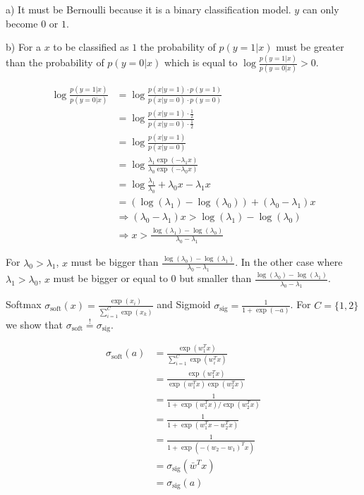%
%
%
\begin{flushleft}
a) It must be Bernoulli because it is a binary classification model. $y$ can only become $0$ or $1$.
\end{flushleft}
\begin{flushleft}
b) For a $x$ to be classified as $1$ the probability of $p(y=1|x)$ must be greater than the probability of $p(y=0|x)$ which is equal to $\log \frac{p(y=1|x)}{p(y=0|x)} > 0$.
\end{flushleft}
\begin{align*}
  \log \frac{p(y=1|x)}{p(y=0|x)} &= \log \frac{p(x|y=1)\cdot p(y=1)}{p(x|y=0)\cdot p(y=0)} \\
  &= \log \frac{p(x|y=1)\cdot \frac{1}{2}}{p(x|y=0)\cdot \frac{1}{2}} \\
  &= \log \frac{p(x|y=1)}{p(x|y=0)} \\
  &= \log \frac{\lambda_1 \exp(-\lambda_1 x)}{\lambda_0 \exp(-\lambda_0 x)} \\
  &= \log \frac{\lambda_1}{\lambda_0} + \lambda_0 x - \lambda_1x \\
  &= (\log(\lambda_1) - \log(\lambda_0)) + (\lambda_0 - \lambda_1)x \\
  &\Rightarrow (\lambda_0 - \lambda_1)x > \log(\lambda_1) - \log(\lambda_0) \\
  &\Rightarrow x > \frac{\log(\lambda_1) - \log(\lambda_0)}{\lambda_0 - \lambda_1}
\end{align*}
\begin{flushleft}
For $\lambda_0 > \lambda_1$, $x$ must be bigger than $\frac{\log(\lambda_0) - \log(\lambda_1)}{\lambda_0 - \lambda_1}$. In the other case where $\lambda_1 > \lambda_0$, $x$ must be bigger or equal to 0 but smaller than $\frac{\log(\lambda_0) - \log(\lambda_1)}{\lambda_0 - \lambda_1}$.
\end{flushleft}
%
%
%
%
\begin{flushleft}
Softmax $\sigma_\text{soft}(x) = \frac{\exp(x_i)}{\sum_{i=1}^C \exp(x_k)}$
and Sigmoid $\sigma_\text{sig} = \frac{1}{1+\exp(-a)}$. For $C = \{1,2\}$ we show that $\sigma_\text{soft} \overset{!}{=} \sigma_\text{sig}$.
\end{flushleft}
\begin{align*}
  \sigma_\text{soft}(a) &= \frac{\exp(w_1^T x)}{\sum_{i=1}^C \exp(w_i^T x)} \\
  &= \frac{\exp(w_1^T x)}{\exp(w_1^T x) \exp(w_2^T x)} \\
  &= \frac{1}{1+ \exp(w_1^T x) / \exp(w_2^T x)} \\
  &= \frac{1}{1+ \exp(w_1^T x - w_2^T x)} \\
  &= \frac{1}{1+ \exp(-(w_2 - w_1)^T x)} \\
  &= \sigma_\text{sig}(\bar{w}^T x) \\
  &= \sigma_\text{sig}(a)
\end{align*}
